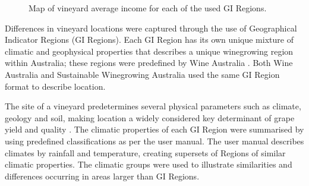 \documentclass[review,12pt,authoryear]{elsarticle}
\begin{document}
\begin{linenumbers}
\begin{figure}
  \caption{Map of vineyard average income for each of the used GI Regions.}\label{fig:map}
\end{figure}%

\par
Differences in vineyard locations were captured through the use of Geographical Indicator Regions (GI Regions). Each GI Region has its own unique mixture of climatic and geophysical properties that describes a unique winegrowing region within Australia; these regions were predefined by Wine Australia \citep{hallidayAustralianWineEncyclopedia2009,oliverReviewSoilPhysical2013,soarClimateDriversRed2008}. Both Wine Australia and Sustainable Winegrowing Australia used the same GI Region format to describe location.
\par
The site of a vineyard predetermines several physical parameters such as climate, geology and soil, making location a widely considered key determinant of grape yield and quality \citep{abbalDecisionSupportSystem2016,agostaRegionalClimateVariability2012,fragaMultivariateClusteringViticultural2017}. The climatic properties of each GI Region were summarised by using predefined classifications as per the \citet{sustainablewinegrowingaustraliaSustainableWinegrowingAustralia2021} user manual. The user manual describes climates by rainfall and temperature, creating supersets of Regions of similar climatic properties. The climatic groups were used to illustrate similarities and differences occurring in areas larger than GI Regions.
\par

\end{linenumbers}
\end{document}
